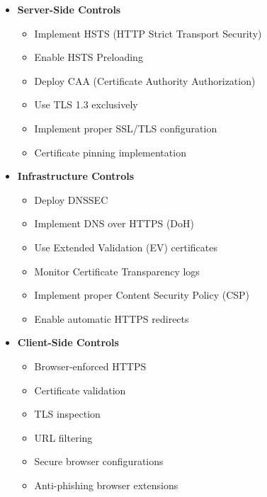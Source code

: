 \begin{itemize}
    \item \textbf{Server-Side Controls}
        \begin{itemize}
            \item Implement HSTS (HTTP Strict Transport Security)
            \item Enable HSTS Preloading
            \item Deploy CAA (Certificate Authority Authorization)
            \item Use TLS 1.3 exclusively
            \item Implement proper SSL/TLS configuration
            \item Certificate pinning implementation
        \end{itemize}
    
    \item \textbf{Infrastructure Controls}
        \begin{itemize}
            \item Deploy DNSSEC
            \item Implement DNS over HTTPS (DoH)
            \item Use Extended Validation (EV) certificates
            \item Monitor Certificate Transparency logs
            \item Implement proper Content Security Policy (CSP)
            \item Enable automatic HTTPS redirects
        \end{itemize}

    \item \textbf{Client-Side Controls}
        \begin{itemize}
            \item Browser-enforced HTTPS
            \item Certificate validation
            \item TLS inspection
            \item URL filtering
            \item Secure browser configurations
            \item Anti-phishing browser extensions
        \end{itemize}
\end{itemize}

